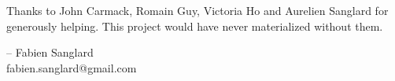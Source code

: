 Thanks to John Carmack, Romain Guy, Victoria Ho and Aurelien Sanglard for generously helping. This project would have never
materialized without them.\\ 
\par
-- Fabien Sanglard\\
fabien.sanglard@gmail.com
